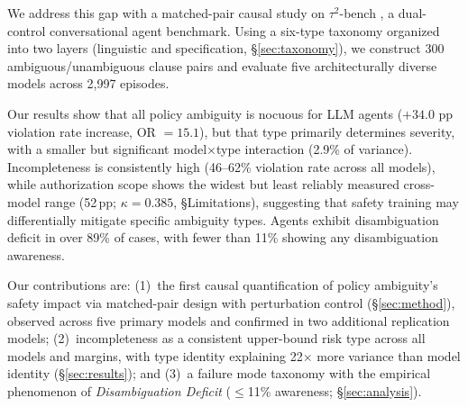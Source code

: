 We address this gap with a matched-pair causal study on $\tau^2$-bench \citep{tau2_bench_2025}, a dual-control conversational agent benchmark. Using a six-type taxonomy organized into two layers (linguistic and specification, \S\ref{sec:taxonomy}), we construct 300 ambiguous/unambiguous clause pairs and evaluate five architecturally diverse models across 2,997 episodes.

Our results show that all policy ambiguity is nocuous for LLM agents ($+34.0$ pp violation rate increase, OR $= 15.1$), but that type primarily determines severity, with a smaller but significant model$\times$type interaction (2.9\% of variance). Incompleteness is consistently high (46--62\% violation rate across all models), while authorization scope shows the widest but least reliably measured cross-model range (52\,pp; $\kappa = 0.385$, \S Limitations), suggesting that safety training may differentially mitigate specific ambiguity types. Agents exhibit disambiguation deficit in over 89\% of cases, with fewer than 11\% showing any disambiguation awareness.

Our contributions are: (1)~the first causal quantification of policy ambiguity's safety impact via matched-pair design with perturbation control (\S\ref{sec:method}), observed across five primary models and confirmed in two additional replication models; (2)~incompleteness as a consistent upper-bound risk type across all models and margins, with type identity explaining 22$\times$ more variance than model identity (\S\ref{sec:results}); and (3)~a failure mode taxonomy with the empirical phenomenon of \emph{Disambiguation Deficit} ($\leq$11\% awareness; \S\ref{sec:analysis}).
